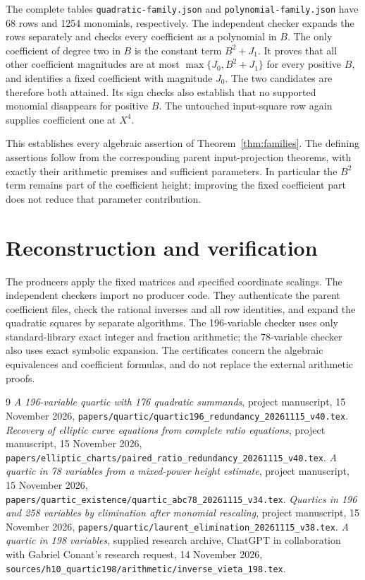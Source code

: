 \documentclass[11pt,a4paper]{article}
\begin{document}
The complete tables \texttt{quadratic-family.json} and
\texttt{polynomial-family.json} have 68 rows and 1254 monomials,
respectively. The independent checker expands the rows separately and
checks every coefficient as a polynomial in $B$. The only coefficient
of degree two in $B$ is the constant term $B^2+J_1$. It proves that all
other coefficient magnitudes are at most
$\max\{J_0,B^2+J_1\}$ for every positive $B$, and identifies a fixed
coefficient with magnitude $J_0$. The two candidates are therefore
both attained. Its sign checks also establish that no supported
monomial disappears for positive $B$. The untouched input-square
row again supplies coefficient one at $X^4$.

This establishes every algebraic assertion of
Theorem~\ref{thm:families}. The defining assertions follow from the
corresponding parent input-projection theorems, with exactly their
arithmetic premises and sufficient parameters. In particular the
$B^2$ term remains part of the coefficient height; improving the fixed
coefficient part does not reduce that parameter contribution.

\section{Reconstruction and verification}
The producers apply the fixed matrices and specified coordinate scalings.
The independent checkers import no producer code. They authenticate the
parent coefficient files, check the rational inverses and all row
identities, and expand the quadratic squares by separate algorithms.
The 196-variable checker uses only standard-library exact integer and
fraction arithmetic; the 78-variable checker also uses exact symbolic
expansion. The certificates concern the algebraic equivalences and
coefficient formulas, and do not replace the external arithmetic proofs.

\begin{thebibliography}{9}
\emph{A 196-variable quartic with 176 quadratic
summands}, project manuscript, 15 November 2026,
\nolinkurl{papers/quartic/quartic196_redundancy_20261115_v40.tex}.
\emph{Recovery of elliptic curve equations from complete
ratio equations}, project manuscript, 15 November 2026,
\nolinkurl{papers/elliptic_charts/paired_ratio_redundancy_20261115_v40.tex}.
\emph{A quartic in 78 variables from a mixed-power height estimate},
project manuscript, 15 November 2026,
\nolinkurl{papers/quartic_existence/quartic_abc78_20261115_v34.tex}.
\emph{Quartics in 196 and 258 variables by elimination
after monomial rescaling}, project manuscript, 15 November 2026,
\nolinkurl{papers/quartic/laurent_elimination_20261115_v38.tex}.
\emph{A quartic in 198 variables}, supplied research
archive, ChatGPT in collaboration with Gabriel Conant's research request,
14 November 2026,
\nolinkurl{sources/h10_quartic198/arithmetic/inverse_vieta_198.tex}.
\end{thebibliography}
\end{document}
